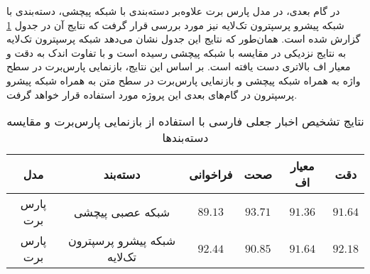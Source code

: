 در گام بعدی، در مدل پارس برت علاوه‌بر دسته‌بندی با شبکه پیچشی، دسته‌بندی با شبکه پیشرو پرسپترون تک‌لایه نیز مورد بررسی قرار گرفت که نتایج آن در جدول \ref{table.text_result_slp} گزارش شده‌ است. همان‌طور که نتایج این جدول نشان می‌دهد شبکه پرسپترون تک‌لایه به نتایج نزدیکی در مقایسه با شبکه پیچشی رسیده‌ است و با تفاوت اندک به دقت و معیار اف بالاتری دست یافته ‌است. بر اساس این نتایج، بازنمایی پارس‌برت در سطح واژه به‌ همراه شبکه پیچشی و بازنمایی پارس‌برت در سطح متن به همراه شبکه پیشرو پرسپترون در گام‌های بعدی این پروژه مورد استفاده قرار خواهد گرفت.

\begin{table}
	\caption{نتایج تشخیص اخبار جعلی فارسی با استفاده از بازنمایی پارس‌برت و مقایسه دسته‌بندها}
	\label{table.text_result_slp}
	\begin{center}
		\begin{tabular}{|c|c|c|c|c|c|}
			\hline
مدل & دسته‌بند & فراخوانی & صحت & معیار اف & دقت \\
			\hline
			\hline
پارس برت & شبکه عصبی پیچشی  & $89.13$ & $93.71$ & $91.36$ & $91.64$ \\
			\hline
پارس برت & شبکه پیشرو پرسپترون تک‌لایه & $92.44$ & $90.85$ & $91.64$ & $92.18$ \\
			\hline
		\end{tabular}
	\end{center}
\end{table}

